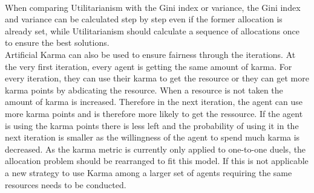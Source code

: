 \documentclass[german, a4paper, 11pt, oneside]{scrbook}
\begin{document}
\\
When comparing Utilitarianism with the Gini index or variance, the Gini index and variance can be calculated step by step even if the former allocation is already set, while Utilitarianism should calculate a sequence of allocations once to ensure the best solutions.
\\Artificial Karma can also be used to ensure fairness through the iterations. At the very first iteration, every agent is getting the same amount of karma. For every iteration, they can use their karma to get the resource or they can get more karma points by abdicating the resource. When a resource is not taken the amount of karma is increased. Therefore in the next iteration, the agent can use more karma points and is therefore more likely to get the ressource. If the agent is using the karma points there is less left and the probability of using it in the next iteration is smaller as the willingness of the agent to spend much karma is decreased. As the karma metric is currently only applied to one-to-one duels, the allocation problem should be rearranged to fit this model. If this is not applicable a new strategy to use Karma among a larger set of agents requiring the same resources needs to be conducted. \cite{Elokda.2023}
\end{document}
